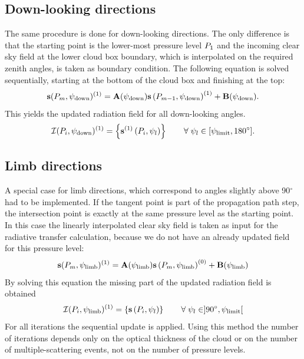 \subsection{Down-looking directions}
The same procedure is done for down-looking directions.  The only
difference is that the starting point is the lower-most pressure level
$P_1$ and the incoming clear sky field at the lower cloud box boundary,
which is interpolated on the required zenith angles, is taken as
boundary condition.  The following equation is solved sequentially,
starting at the bottom of the cloud box and finishing at the top:
\begin{equation}
  {\bf s} ( P_{m},\psi_\mathrm{down} ) ^{(1)} = 
  \mathbf{A}(\psi_\mathrm{down}) {\bf s}\left( P_{m-1},\psi_\mathrm{down} \right)^{(1)} 
  + \mathbf{B}(\psi_\mathrm{down}).
\end{equation}
This yields the updated radiation field for all down-looking angles.
\begin{equation}
  {\mathcal I}(P_i, \psi_\mathrm{down})^{(1)} = \left\{ {\bf s}^{(1)} \left( P_i,\psi_l \right) \right\}  \qquad
  \forall \;  \psi_l \in [\psi_\mathrm{limit}, 180^\circ].
\end{equation}

\subsection{Limb directions}
A special case for limb directions, which correspond to angles
slightly above 90$^\circ$\, had to be implemented.  If the tangent
point is part of the propagation path step, the intersection point is
exactly at the same pressure level as the starting point.  In this
case the linearly interpolated clear sky field is taken as input for
the radiative transfer calculation, because we do not have an already
updated field for this pressure level:
\begin{equation}
  {\bf s} ( P_{m},\psi_\mathrm{limb} ) ^{(1)} =   
  \mathbf{A}(\psi_\mathrm{limb}) {\bf s}\left( P_{m},\psi_\mathrm{limb} \right)^{(0)} 
  + \mathbf{B}(\psi_\mathrm{limb})
\end{equation}
By solving this equation the missing part of the updated radiation
field is obtained
\begin{equation}
  {\mathcal I}(P_i, \psi_\mathrm{limb})^{(1)} = \left\{{\bf s} \left( P_i,\psi_l \right) \right\}  \qquad
  \forall \;  \psi_l \in  ]90^\circ, \psi_\mathrm{limit}[
\end{equation}
For all iterations the sequential update is applied. Using this method
the number of iterations depends only on the optical thickness of the
cloud or on the number of multiple-scattering events, not on the
number of pressure levels.


